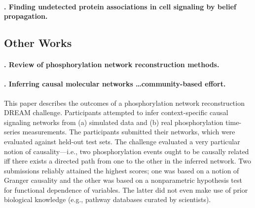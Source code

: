 \documentclass[14pt]{article}
\begin{document}
\paragraph{ \citet{2011-bailly-bechet-belief}. Finding undetected protein associations in cell signaling by belief propagation.}




\subsection{Other Works}

\paragraph{ \citet{2018-invergo-review}. Review of phosphorylation network reconstruction methods. }

\paragraph{ \citet{2016-hill-community}. Inferring causal molecular networks \ldots community-based effort.}
This paper describes the outcomes of a phosphorylation network reconstruction DREAM challenge.
Participants attempted to infer context-specific causal signaling networks from (a) simulated data and (b) real phosphorylation time-series measurements.
The participants submitted their networks, which were evaluated against held-out test sets.
The challenge evaluated a very particular notion of causality---i.e., two phosphorylation events ought to be causally related iff there exists a directed path from one to the other in the inferred network.
Two submissions reliably attained the highest scores; one was based on a notion of Granger causality and the other was based on a nonparametric hypothesis test for functional dependence of variables.
The latter did not even make use of prior biological knowledge (e.g., pathway databases curated by scientists).
\end{document}
